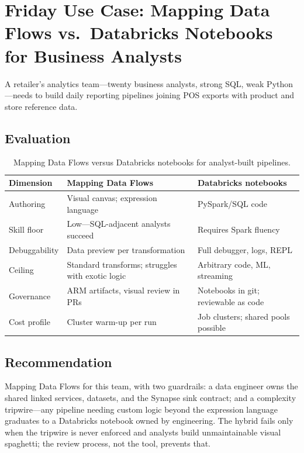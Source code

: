 \section{Friday Use Case: Mapping Data Flows vs.\ Databricks Notebooks for Business Analysts}
A retailer's analytics team---twenty business analysts, strong SQL, weak Python---needs to build daily reporting pipelines joining POS exports with product and store reference data.

\subsection{Evaluation}
\begin{table}[H]
\centering
\small
\begin{tabular}{@{}p{3.4cm}p{4.9cm}p{4.9cm}@{}}
\toprule
\textbf{Dimension} & \textbf{Mapping Data Flows} & \textbf{Databricks notebooks} \\
\midrule
Authoring & Visual canvas; expression language & PySpark/SQL code \\
Skill floor & Low---SQL-adjacent analysts succeed & Requires Spark fluency \\
Debuggability & Data preview per transformation & Full debugger, logs, REPL \\
Ceiling & Standard transforms; struggles with exotic logic & Arbitrary code, ML, streaming \\
Governance & ARM artifacts, visual review in PRs & Notebooks in git; reviewable as code \\
Cost profile & Cluster warm-up per run & Job clusters; shared pools possible \\
\bottomrule
\end{tabular}
\caption{Mapping Data Flows versus Databricks notebooks for analyst-built pipelines.}
\label{tab:ch10-mdf-vs-dbx}
\end{table}

\subsection{Recommendation}
Mapping Data Flows for this team, with two guardrails: a data engineer owns the shared linked services, datasets, and the Synapse sink contract; and a complexity tripwire---any pipeline needing custom logic beyond the expression language graduates to a Databricks notebook owned by engineering. The hybrid fails only when the tripwire is never enforced and analysts build unmaintainable visual spaghetti; the review process, not the tool, prevents that.

